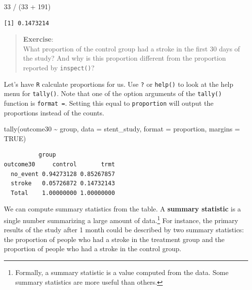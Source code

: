 \documentclass[
  letterpaper,
  DIV=11,
  numbers=noendperiod]{scrreprt}
\newenvironment{Shaded}{\begin{snugshade}}{\end{snugshade}}
\newcommand{\AttributeTok}[1]{\textcolor[rgb]{0.40,0.45,0.13}{#1}}
\newcommand{\ConstantTok}[1]{\textcolor[rgb]{0.56,0.35,0.01}{#1}}
\newcommand{\DecValTok}[1]{\textcolor[rgb]{0.68,0.00,0.00}{#1}}
\newcommand{\FunctionTok}[1]{\textcolor[rgb]{0.28,0.35,0.67}{#1}}
\newcommand{\NormalTok}[1]{\textcolor[rgb]{0.00,0.23,0.31}{#1}}
\newcommand{\SpecialCharTok}[1]{\textcolor[rgb]{0.37,0.37,0.37}{#1}}
\newcommand{\StringTok}[1]{\textcolor[rgb]{0.13,0.47,0.30}{#1}}
\begin{document}
\begin{Shaded}
\begin{Highlighting}[]
\DecValTok{33} \SpecialCharTok{/}\NormalTok{ (}\DecValTok{33} \SpecialCharTok{+} \DecValTok{191}\NormalTok{)}
\end{Highlighting}
\end{Shaded}

\begin{verbatim}
[1] 0.1473214
\end{verbatim}

\begin{quote}
\textbf{Exercise}:\\
What proportion of the control group had a stroke in the first 30 days
of the study? And why is this proportion different from the proportion
reported by \texttt{inspect()}?
\end{quote}

Let's have \texttt{R} calculate proportions for us. Use \texttt{?} or
\texttt{help()} to look at the help menu for \texttt{tally()}. Note that
one of the option arguments of the \texttt{tally()} function is
\texttt{format\ =}. Setting this equal to \texttt{proportion} will
output the proportions instead of the counts.

\begin{Shaded}
\begin{Highlighting}[]
\FunctionTok{tally}\NormalTok{(outcome30 }\SpecialCharTok{\textasciitilde{}}\NormalTok{ group, }\AttributeTok{data =}\NormalTok{ stent\_study, }\AttributeTok{format =} \StringTok{\textquotesingle{}proportion\textquotesingle{}}\NormalTok{, }\AttributeTok{margins =} \ConstantTok{TRUE}\NormalTok{)}
\end{Highlighting}
\end{Shaded}

\begin{verbatim}
          group
outcome30     control       trmt
  no_event 0.94273128 0.85267857
  stroke   0.05726872 0.14732143
  Total    1.00000000 1.00000000
\end{verbatim}

We can compute summary statistics from the table. A \textbf{summary
statistic} is a single number summarizing a large amount of
data.\footnote{Formally, a summary statistic is a value computed from
  the data. Some summary statistics are more useful than others.} For
instance, the primary results of the study after 1 month could be
described by two summary statistics: the proportion of people who had a
stroke in the treatment group and the proportion of people who had a
stroke in the control group.
\end{document}
